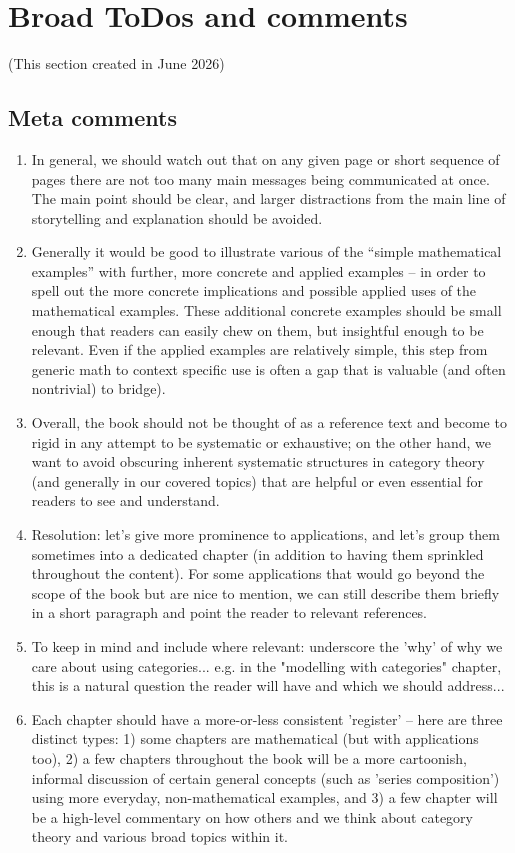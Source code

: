 
\section{Broad ToDos and comments}

(This section created in June 2026)


\subsection{Meta comments}

\begin{enumerate}
\item In general, we should watch out that on any given page or short sequence of pages there are not too many main messages being communicated at once. The main point should be clear, and larger distractions from the main line of storytelling and explanation should be avoided. 
\item Generally it would be good to illustrate various of the ``simple mathematical examples'' with further, more concrete and applied examples -- in order to spell out the more concrete implications and possible applied uses of the mathematical examples. These additional concrete examples should be small enough that readers can easily chew on them, but insightful enough to be relevant. Even if the applied examples are relatively simple, this step from generic math to context specific use is often a gap that is valuable (and often nontrivial) to bridge). 
\item Overall, the book should not be thought of as a reference text and become to rigid in any attempt to be systematic or exhaustive; on the other hand, we want to avoid obscuring inherent systematic structures in category theory (and generally in our covered topics) that are helpful or even essential for readers to see and understand. 
\item Resolution: let's give more prominence to applications, and let's group them sometimes into a dedicated chapter (in addition to having them sprinkled throughout the content). For some applications that would go beyond the scope of the book but are nice to mention, we can still describe them briefly in a short paragraph and point the reader to relevant references.
\item To keep in mind and include where relevant: underscore the 'why' of why we care about using categories... e.g. in the "modelling with categories" chapter, this is a natural question the reader will have and which we should address...
\item Each chapter should have a more-or-less consistent 'register'  -- here are three distinct types: 1) some chapters are mathematical (but with applications too), 2) a few chapters throughout the book will be a more cartoonish, informal discussion of certain general concepts (such as 'series composition') using more everyday, non-mathematical examples, and 3) a few chapter will be a high-level commentary on how others and we think about category theory and various broad topics within it. 
\end{enumerate}


